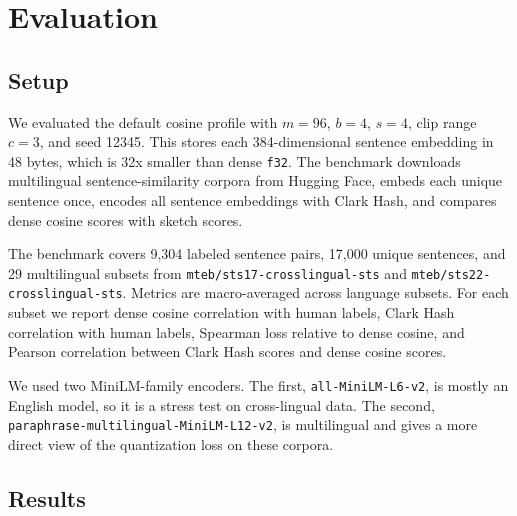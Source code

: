 \documentclass[11pt]{article}
\newcommand{\code}[1]{\texttt{#1}}
\begin{document}
\section{Evaluation}

\subsection{Setup}

We evaluated the default cosine profile with $m=96$, $b=4$, $s=4$, clip range
$c=3$, and seed 12345. This stores each 384-dimensional sentence embedding in
48 bytes, which is 32x smaller than dense \code{f32}. The benchmark downloads
multilingual sentence-similarity corpora from Hugging Face, embeds each unique
sentence once, encodes all sentence embeddings with Clark Hash, and compares
dense cosine scores with sketch scores.

The benchmark covers 9,304 labeled sentence pairs, 17,000 unique sentences, and
29 multilingual subsets from \code{mteb/sts17-crosslingual-sts} and
\code{mteb/sts22-crosslingual-sts}. Metrics are macro-averaged across language
subsets. For each subset we report dense cosine correlation with human labels,
Clark Hash correlation with human labels, Spearman loss relative to dense
cosine, and Pearson correlation between Clark Hash scores and dense cosine
scores.

We used two MiniLM-family encoders. The first, \code{all-MiniLM-L6-v2}, is
mostly an English model, so it is a stress test on cross-lingual data. The
second, \code{paraphrase-multilingual-MiniLM-L12-v2}, is multilingual and gives
a more direct view of the quantization loss on these corpora.

\subsection{Results}
\end{document}
